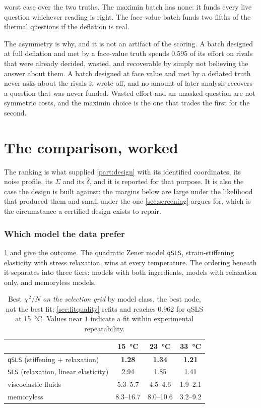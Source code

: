 \documentclass[10pt]{article}
\begin{document}
\noindent worst case over the two truths. The maximin batch has none: it funds every live
question whichever reading is right. The face-value batch funds two fifths of the thermal
questions if the deflation is real.

The asymmetry is why, and it is not an artifact of the scoring. A batch designed at full
deflation and met by a face-value truth spends $0.595$ of its effort on rivals that were already
decided, wasted, and recoverable by simply not believing the answer about them. A batch
designed at face value and met by a deflated truth never asks about the rivals it wrote off, and
no amount of later analysis recovers a question that was never funded. Wasted effort and an
unasked question are not symmetric costs, and the maximin choice is the one that trades the
first for the second.

\part{The comparison, worked}
\label{part:case}

\noindent The ranking is what supplied \cref{part:design} with its identified coordinates, its
noise profile, its $\Sigma$ and its $\hat\delta$, and it is reported for that purpose. It is
also the case the design is built against: the margins below are large under the likelihood
that produced them and small under the one \cref{sec:screening} argues for, which is the
circumstance a certified design exists to repair.

\section{Which model the data prefer}

\cref{tab:fits} and  give the outcome. The quadratic Zener model
\texttt{qSLS}, strain-stiffening elasticity with stress relaxation, wins at every
temperature. The ordering beneath it separates into three tiers: models with both
ingredients, models with relaxation only, and memoryless models.

\begin{table}[htbp]
\centering
\caption{Best $\chi^2/N$ \emph{on the selection grid} by model class, the best node, not the best fit; \cref{sec:fitquality} refits and reaches $0.962$ for qSLS at \SI{15}{\celsius}. Values near $1$ indicate a fit within
experimental repeatability.}
\label{tab:fits}
\begin{tabular}{lccc}
\toprule
& \SI{15}{\celsius} & \SI{23}{\celsius} & \SI{33}{\celsius} \\
\midrule
\texttt{qSLS} (stiffening $+$ relaxation) & \textbf{1.28} & \textbf{1.34} & \textbf{1.21} \\
\texttt{SLS} (relaxation, linear elasticity) & 2.94 & 1.85 & 1.41 \\
viscoelastic fluids & 5.3--5.7 & 4.5--4.6 & 1.9--2.1 \\
memoryless & 8.3--16.7 & 8.0--10.6 & 3.2--9.2 \\
\bottomrule
\end{tabular}
\end{table}
\end{document}
